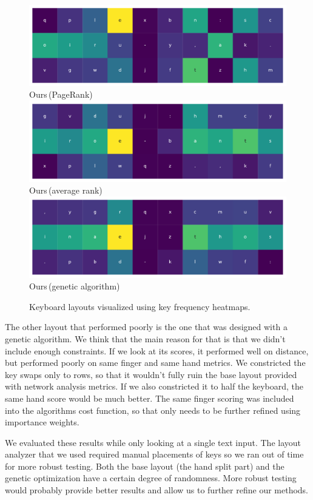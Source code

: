 \documentclass[9pt,twocolumn,twoside]{pnas-report}
\begin{document}
\begin{figure}
    \vskip5pt
    \includegraphics[width=0.8\linewidth]{fig/pagerank}\\
    \small{Ours\,(PageRank)}
    \vskip5pt
    \includegraphics[width=0.8\linewidth]{fig/average}\\
    \small{Ours\,(average rank)}
    \vskip5pt
    \includegraphics[width=0.8\linewidth]{fig/genetic}\\
    \small{Ours\,(genetic algorithm)}
    \caption{Keyboard layouts visualized using key frequency heatmaps.}
    \label{fig:layouts}
\end{figure}

The other layout that performed poorly is the one that was designed with a genetic algorithm.
We think that the main reason for that is that we didn't include enough constraints.
If we look at its scores, it performed well on distance, but performed poorly on same finger and same hand metrics.
We constricted the key swaps only to rows, so that it wouldn't fully ruin the base layout provided with network analysis metrics.
If we also constricted it to half the keyboard, the same hand score would be much better.
The same finger scoring was included into the algorithms cost function, so that only needs to be further refined using importance weights.

We evaluated these results while only looking at a single text input.
The layout analyzer that we used required manual placements of keys so we ran out of time for more robust testing.
Both the base layout (the hand split part) and the genetic optimization have a certain degree of randomness.
More robust testing would probably provide better results and allow us to further refine our methods.
\end{document}
